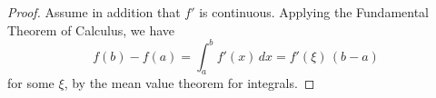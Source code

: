 

\begin{proof} Assume in addition that $f'$ is continuous.
Applying the Fundamental Theorem of Calculus, we have 
$$
f(b)-f(a) = \int_a^b f'(x)\,dx = f'(\xi)\,(b-a)
$$
for some $\xi$, by the mean value theorem for integrals.

\end{proof}

